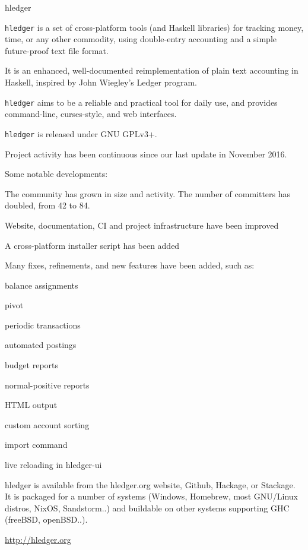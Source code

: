 \begin{hcarentry}[updated]{hledger}
\label{hledger}
\makeheader

{\tt hledger} is a set of cross-platform tools (and Haskell libraries) for
tracking money, time, or any other commodity, using double-entry accounting
and a simple future-proof text file format.

It is an enhanced, well-documented reimplementation of plain text accounting
in Haskell, inspired by John Wiegley's Ledger program.

{\tt hledger} aims to be a reliable and practical tool for daily use, and
provides command-line, curses-style, and web interfaces.

{\tt hledger} is released under GNU GPLv3+.

Project activity has been continuous since our last update in November 2016.

Some notable developments:

\begin{compactitem}
\item The community has grown in size and activity. The number of committers has doubled, from 42 to 84.
\item Website, documentation, CI and project infrastructure have been improved
\item A cross-platform installer script has been added
\item Many fixes, refinements, and new features have been added, such as:
\item balance assignments
\item pivot
\item periodic transactions
\item automated postings
\item budget reports
\item normal-positive reports
\item HTML output
\item custom account sorting
\item import command
\item live reloading in hledger-ui
\end{compactitem}

hledger is available from the hledger.org website, Github, Hackage, or
Stackage. It is packaged for a number of systems (Windows, Homebrew, most
GNU/Linux distros, NixOS, Sandstorm..) and buildable on other systems
supporting GHC (freeBSD, openBSD..).

\FurtherReading
  \url{http://hledger.org}
\end{hcarentry}
